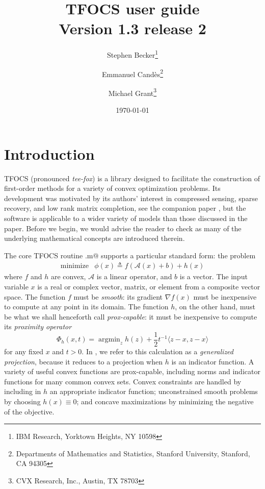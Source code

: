 \documentclass{article}
\title{TFOCS user guide\\\large Version 1.3 release 2} %
\author{Stephen Becker\thanks{IBM Research, Yorktown Heights, NY 10598} \and
Emmanuel Cand\`es\thanks{Departments of Mathematics and Statistics, Stanford University, Stanford, CA 94305} \and
Michael Grant\thanks{CVX Research, Inc., Austin, TX 78703}}
\date{\today}
\newcommand{\cA}{\ensuremath{\mathcal{A}}}    %
\DeclareMathOperator*{\minimize}{minimize}
\DeclareMathOperator*{\argmin}{argmin}
\newcommand\thalf{{\textstyle\frac{1}{2}}}
\newcommand{\<}{\langle}
\renewcommand{\>}{\rangle}
\begin{document}
\maketitle

\tableofcontents

\section{Introduction}

TFOCS (pronounced \emph{tee-fox}) is a library designed to facilitate
the construction of first-order methods for a variety of convex
optimization problems. Its development was motivated by its authors'
interest in compressed sensing, sparse recovery, and low rank matrix
completion, see the companion paper \cite{TFOCS}, but the software is
applicable to a wider variety of models than those discussed in the
paper. Before we begin, we would advise the reader to check
\cite{TFOCS} as many of the underlying mathematical concepts are
introduced therein.

The core TFOCS routine \verb@tfocs.m@ supports a particular standard
form: the problem
\begin{equation} 
	\label{eq:stdform}
	\begin{array}{ll}
	\minimize & \phi(x) \triangleq f(\cA(x)+b) + h(x)
	\end{array}
\end{equation}
where $f$ and $h$ are convex, $\cA$ is a linear operator,
and $b$ is a vector. 
The input variable $x$ is a real or complex vector, matrix, or element
from a composite vector space.
The function $f$ must be \emph{smooth}:
its gradient $\nabla f(x)$ must be inexpensive to compute at any
point in its domain. The function $h$,
on the other hand, must be what we shall
henceforth call \emph{prox-capable}: it must
be inexpensive to compute its \emph{proximity operator}
\begin{equation}
	\label{eq:proxmin}
	\Phi_h(x,t) = \argmin_z h(z) + \thalf t^{-1} \<z-x,z-x\>
\end{equation}
for any fixed $x$ and $t>0$. 
In \cite{TFOCS}, we refer to this calculation as a \emph{generalized
projection}, because it reduces to a projection when $h$ is an indicator
function. A variety of useful convex functions are
prox-capable, including norms and indicator functions for many
common convex sets.
Convex constraints are handled by including in $h$ an appropriate
indicator function; unconstrained smooth problems
by choosing $h(x)\equiv 0$; and concave maximizations by
minimizing the negative of the objective.
\end{document}
